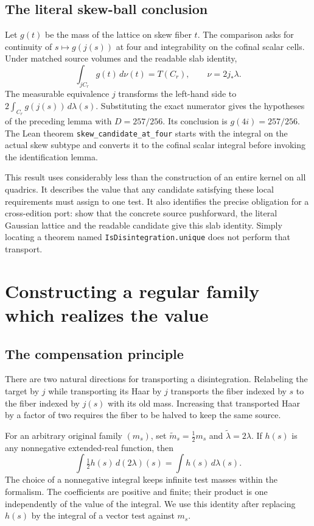 \documentclass[12pt,letterpaper]{article}
\newcommand{\id}[1]{{\small\nolinkurl{#1}}}
\begin{document}
\subsection{The literal skew-ball conclusion}
Let $g(t)$ be the mass of the lattice on skew fiber $t$. The comparison asks for continuity of $s\mapsto g(j(s))$ at four and integrability on the cofinal scalar cells. Under matched source volumes and the readable slab identity,
\[
 \int_{jC_r}g(t)\,d\nu(t)=T(C_r),\qquad \nu=2j_*\lambda.
\]
The measurable equivalence $j$ transforms the left-hand side to $2\int_{C_r} g(j(s))\,d\lambda(s)$. Substituting the exact numerator gives the hypotheses of the preceding lemma with $D=257/256$. Its conclusion is $g(4i)=257/256$. The Lean theorem \id{skew_candidate_at_four} starts with the integral on the actual skew subtype and converts it to the cofinal scalar integral before invoking the identification lemma.

This result uses considerably less than the construction of an entire kernel on all quadrics. It describes the value that any candidate satisfying these local requirements must assign to one test. It also identifies the precise obligation for a cross-edition port: show that the concrete source pushforward, the literal Gaussian lattice and the readable candidate give this slab identity. Simply locating a theorem named \id{IsDisintegration.unique} does not perform that transport.

\section{Constructing a regular family which realizes the value}
\subsection{The compensation principle}
There are two natural directions for transporting a disintegration. Relabeling the target by $j$ while transporting its Haar by $j$ transports the fiber indexed by $s$ to the fiber indexed by $j(s)$ with its old mass. Increasing that transported Haar by a factor of two requires the fiber to be halved to keep the same source.

For an arbitrary original family $(m_s)$, set $\widetilde m_s=\tfrac12 m_s$ and $\widetilde\lambda=2\lambda$. If $h(s)$ is any nonnegative extended-real function, then
\[
    \int \tfrac12 h(s)\,d(2\lambda)(s)=\int h(s)\,d\lambda(s).
\]
The choice of a nonnegative integral keeps infinite test masses within the formalism. The coefficients are positive and finite; their product is one independently of the value of the integral. We use this identity after replacing $h(s)$ by the integral of a vector test against $m_s$.
\end{document}
